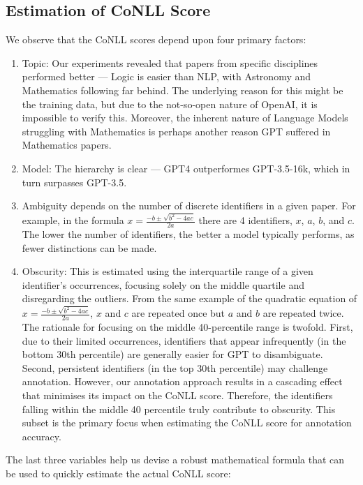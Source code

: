 \subsection{Estimation of CoNLL Score}
We observe that the CoNLL scores depend upon four primary factors: 
    \begin{enumerate}
        \item Topic: Our experiments revealed that papers from specific disciplines performed better — Logic is easier than NLP, with Astronomy and Mathematics following far behind. The underlying reason for this might be the training data, but due to the not-so-open nature of OpenAI, it is impossible to verify this. Moreover, the inherent nature of Language Models struggling with Mathematics is perhaps another reason GPT suffered in Mathematics papers.
        
        \item Model: The hierarchy is clear — GPT4 outperformes GPT-3.5-16k, which in turn surpasses GPT-3.5. 

        \item Ambiguity depends on the number of discrete identifiers in a given paper. For example, in the formula $x = \frac{-b \pm \sqrt{b^2 - 4ac}}{2a}$ there are 4 identifiers, $x$, $a$, $b$, and $c$. The lower the number of identifiers, the better a model typically performs, as fewer distinctions can be made.
        
        \item Obscurity: This is estimated using the interquartile range of a given identifier's occurrences, focusing solely on the middle quartile and disregarding the outliers. From the same example of the quadratic equation of $x = \frac{-b \pm \sqrt{b^2 - 4ac}}{2a}$, $x$ and $c$ are repeated once but $a$ and $b$ are repeated twice. The rationale for focusing on the middle 40-percentile range is twofold. First, due to their limited occurrences, identifiers that appear infrequently (in the bottom 30th percentile) are generally easier for GPT to disambiguate. Second, persistent identifiers (in the top 30th percentile) may challenge annotation. However, our annotation approach results in a cascading effect that minimises its impact on the CoNLL score. Therefore, the identifiers falling within the middle 40 percentile truly contribute to obscurity. This subset is the primary focus when estimating the CoNLL score for annotation accuracy.
    \end{enumerate}

The last three variables help us devise a robust mathematical formula that can be used to quickly estimate the actual CoNLL score:

